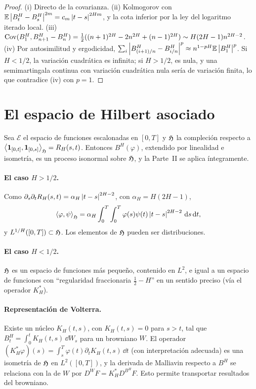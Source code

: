 \begin{proof}
(i) Directo de la covarianza. (ii) Kolmogorov con $\mathbb{E}\left\lvert B^H_t-B^H_s\right\rvert^{2m}=
c_m\left\lvert t-s\right\rvert^{2Hm}$, y la cota inferior por la ley del logaritmo iterado local. (iii) $\operatorname{Cov}(B^H_1,B^H_{n+1}-B^H_n)=
\frac12((n+1)^{2H}-2n^{2H}+(n-1)^{2H})\sim H(2H-1)n^{2H-2}$. (iv) Por autosimilitud y ergodicidad,
$\sum_i\left\lvert B^H_{(i+1)/n}-B^H_{i/n}\right\rvert^p\approx n^{1-pH}\mathbb{E}\left\lvert B^H_1\right\rvert^p$. Si $H<1/2$, la variación cuadrática es infinita; si
$H>1/2$, es nula, y una semimartingala continua con variación cuadrática nula sería de
variación finita, lo que contradice (iv) con $p=1$.
\end{proof}

\section{El espacio de Hilbert asociado}
Sea $\mathcal E$ el espacio de funciones escalonadas en $[0,T]$ y $\mathfrak{H}$ la compleción respecto a $\left\langle \mathbf{1}_{[0,t]}, \mathbf{1}_{[0,s]}\right\rangle_{\mathfrak{H}}=
R_H(s,t)$. Entonces $B^H(\varphi)$, extendido por linealidad e isometría, es un proceso isonormal sobre
$\mathfrak{H}$, y la Parte~II se aplica íntegramente.

\paragraph{El caso $H>1/2$.} Como $\partial_s\partial_tR_H(s,t)=\alpha_H\left\lvert t-s\right\rvert^{2H-2}$, con $\alpha_H=H(2H-1)$,
\[
  \left\langle \varphi, \psi\right\rangle_{\mathfrak{H}}=\alpha_H\int_0^T\int_0^T\varphi(s)\psi(t)\left\lvert t-s\right\rvert^{2H-2}\,\mathrm{d} s\,\mathrm{d} t,
\]
y $L^{1/H}([0,T])\subset\mathfrak{H}$. Los elementos de $\mathfrak{H}$ pueden ser distribuciones.

\paragraph{El caso $H<1/2$.} $\mathfrak{H}$ es un espacio de funciones más pequeño, contenido en $L^2$, e igual a un
espacio de funciones con ``regularidad fraccionaria $\frac12-H$'' en un sentido preciso (vía el operador
$K_H^*$).

\paragraph{Representación de Volterra.} Existe un núcleo $K_H(t,s)$, con $K_H(t,s)=0$ para $s>t$, tal que
$B^H_t=\int_0^tK_H(t,s)\,\dd W_s$ para un browniano $W$. El operador $(K_H^*\varphi)(s)=\int_s^T\varphi(t)\partial_tK_H(t,s)\,\dd t$
(con interpretación adecuada) es una isometría de $\mathfrak{H}$ en $L^2([0,T])$, y la derivada de Malliavin
respecto a $B^H$ se relaciona con la de $W$ por $D^WF=K_H^*D^{B^H}F$. Esto permite transportar
resultados del browniano.

